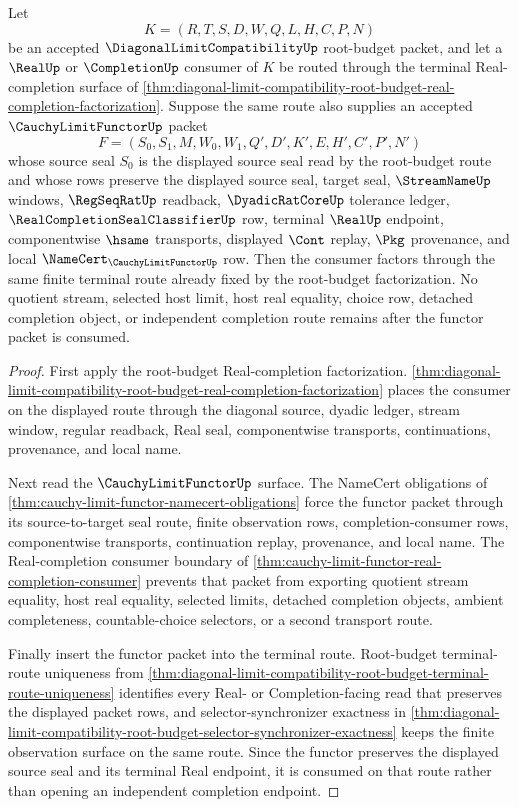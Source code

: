 \begin{theorem}
\label{thm:diagonal-limit-compatibility-cauchy-limit-functor-handoff}
Let
$$
K=(R,T,S,D,W,Q,L,H,C,P,N)
$$
be an accepted $\DiagonalLimitCompatibilityUp$ root-budget packet, and let a $\RealUp$ or $\CompletionUp$ consumer of $K$ be routed through the terminal Real-completion surface of \autoref{thm:diagonal-limit-compatibility-root-budget-real-completion-factorization}. Suppose the same route also supplies an accepted $\CauchyLimitFunctorUp$ packet
$$
F=(S_0,S_1,M,W_0,W_1,Q',D',K',E,H',C',P',N')
$$
whose source seal $S_0$ is the displayed source seal read by the root-budget route and whose rows preserve the displayed source seal, target seal, $\StreamNameUp$ windows, $\RegSeqRatUp$ readback, $\DyadicRatCoreUp$ tolerance ledger, $\RealCompletionSealClassifierUp$ row, terminal $\RealUp$ endpoint, componentwise $\hsame$ transports, displayed $\Cont$ replay, $\Pkg$ provenance, and local $\NameCert_{\CauchyLimitFunctorUp}$ row. Then the consumer factors through the same finite terminal route already fixed by the root-budget factorization. No quotient stream, selected host limit, host real equality, choice row, detached completion object, or independent completion route remains after the functor packet is consumed.
\end{theorem}
\begin{proof}
First apply the root-budget Real-completion factorization. \autoref{thm:diagonal-limit-compatibility-root-budget-real-completion-factorization} places the consumer on the displayed route through the diagonal source, dyadic ledger, stream window, regular readback, Real seal, componentwise transports, continuations, provenance, and local name.

Next read the $\CauchyLimitFunctorUp$ surface. The NameCert obligations of \autoref{thm:cauchy-limit-functor-namecert-obligations} force the functor packet through its source-to-target seal route, finite observation rows, completion-consumer rows, componentwise transports, continuation replay, provenance, and local name. The Real-completion consumer boundary of \autoref{thm:cauchy-limit-functor-real-completion-consumer} prevents that packet from exporting quotient stream equality, host real equality, selected limits, detached completion objects, ambient completeness, countable-choice selectors, or a second transport route.

Finally insert the functor packet into the terminal route. Root-budget terminal-route uniqueness from \autoref{thm:diagonal-limit-compatibility-root-budget-terminal-route-uniqueness} identifies every Real- or Completion-facing read that preserves the displayed packet rows, and selector-synchronizer exactness in \autoref{thm:diagonal-limit-compatibility-root-budget-selector-synchronizer-exactness} keeps the finite observation surface on the same route. Since the functor preserves the displayed source seal and its terminal Real endpoint, it is consumed on that route rather than opening an independent completion endpoint.
\end{proof}

